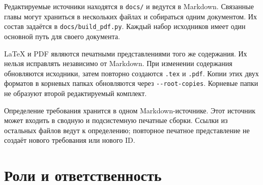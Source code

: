 \documentclass[12pt,a4paper]{article}
\begin{document}
\hypertarget{исходники-и-печатные-представления}{}

Редактируемые источники находятся в \texttt{docs/} и ведутся в Markdown. Связанные главы могут храниться в нескольких файлах и собираться одним документом. Их состав задаётся в \texttt{docs/\allowbreak{}build\_\allowbreak{}pdf.\allowbreak{}py}. Каждый набор исходников имеет один основной путь для своего документа.

LaTeX и PDF являются печатными представлениями того же содержания. Их нельзя исправлять независимо от Markdown. При изменении содержания обновляются исходники, затем повторно создаются \texttt{.tex} и \texttt{.pdf}. Копии этих двух форматов в корневых папках обновляются через \texttt{-\allowbreak{}-\allowbreak{}root-\allowbreak{}copies}. Корневые папки не образуют второй редактируемый комплект.

Определение требования хранится в одном Markdown-источнике. Этот источник может входить в сводную и подсистемную печатные сборки. Ссылки из остальных файлов ведут к определению; повторное печатное представление не создаёт нового требования или нового ID.

\section{Роли и ответственность}\label{3-ux440ux43eux43bux438-ux438-ux43eux442ux432ux435ux442ux441ux442ux432ux435ux43dux43dux43eux441ux442ux44c}

\hypertarget{3-роли-и-ответственность}{}
\end{document}
